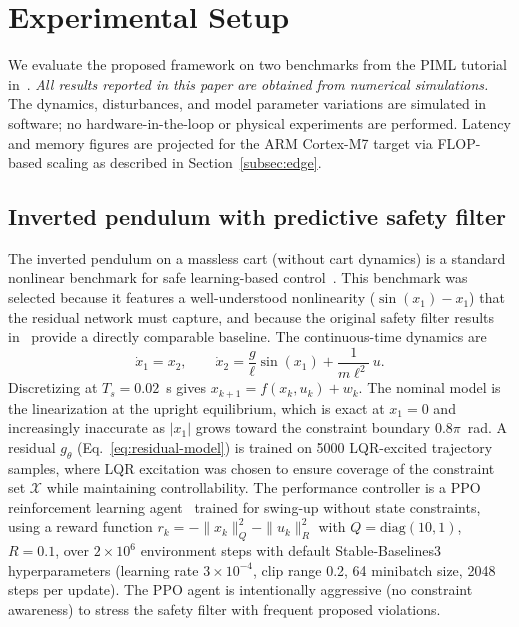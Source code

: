 \documentclass[12pt,a4paper]{article}
\begin{document}
\section{Experimental Setup}
\label{sec:setup}

We evaluate the proposed framework on two benchmarks from the PIML
tutorial in~\cite{nghiem2023piml}. \emph{All results reported in this
paper are obtained from numerical simulations.} The dynamics,
disturbances, and model parameter variations are simulated in software;
no hardware-in-the-loop or physical experiments are performed. Latency
and memory figures are projected for the ARM Cortex-M7 target via
FLOP-based scaling as described in Section~\ref{subsec:edge}.

\subsection{Inverted pendulum with predictive safety filter}
\label{subsec:pendulum-setup}

The inverted pendulum on a massless cart (without cart dynamics) is a
standard nonlinear benchmark for safe learning-based
control~\cite{wabersich2021psf}. This benchmark was selected because
it features a well-understood nonlinearity ($\sin(x_1) - x_1$) that
the residual network must capture, and because the original safety
filter results in~\cite{wabersich2021psf} provide a directly
comparable baseline. The continuous-time dynamics are
\begin{equation}
  \dot{x}_1 = x_2, \qquad
  \dot{x}_2 = \frac{g}{\ell}\sin(x_1) + \frac{1}{m\ell^2}\,u.
  \label{eq:pend-dynamics}
\end{equation}
Discretizing at $T_s = 0.02$~s gives $x_{k+1} = f(x_k,u_k) + w_k$.
The nominal model is the linearization at the upright equilibrium,
which is exact at $x_1 = 0$ and increasingly inaccurate as $|x_1|$
grows toward the constraint boundary $0.8\pi$~rad.
A residual $g_\theta$ (Eq.~\ref{eq:residual-model}) is trained on
5000 LQR-excited trajectory samples, where LQR excitation was chosen
to ensure coverage of the constraint set $\mathcal{X}$ while
maintaining controllability. The performance controller is a PPO
reinforcement learning agent~\cite{ordonez2023pirl} trained for
swing-up without state constraints, using a reward function
$r_k = -\|x_k\|_Q^2 - \|u_k\|_R^2$ with $Q = \mathrm{diag}(10,1)$,
$R = 0.1$, over $2 \times 10^6$ environment steps with default
Stable-Baselines3 hyperparameters (learning rate $3 \times 10^{-4}$,
clip range 0.2, 64 minibatch size, 2048 steps per update). The PPO
agent is intentionally aggressive (no constraint awareness) to stress
the safety filter with frequent proposed violations.
\end{document}
